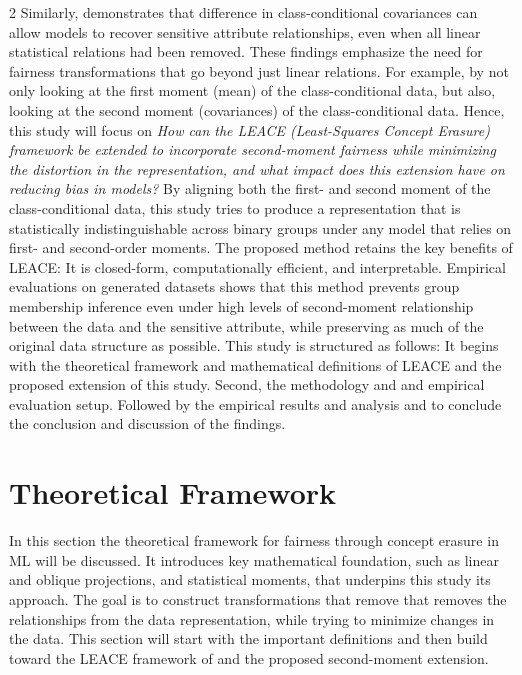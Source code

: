 \documentclass[ecta,nameyear,final]{econsocart}
\numberwithin{equation}{section}
\theoremstyle{plain}
\theoremstyle{definition}
\begin{document}
\begin{multicols}{2}
\newline \newline
Similarly, \cite{Shashwat2024} demonstrates that difference in class-conditional covariances can allow models to recover sensitive attribute relationships, even when all linear statistical relations had been removed. 
\newline \newline
These findings emphasize the need for fairness transformations that go beyond just linear relations. For example, by not only looking at the first moment (mean) of the class-conditional data, but also, looking at the second moment (covariances) of the class-conditional data.
\newline \newline
Hence, this study will focus on \emph{How can the LEACE (Least-Squares Concept Erasure) framework be extended to incorporate second-moment fairness while minimizing the distortion in the representation, and what impact does this extension have on reducing bias in models?}
\newline \newline
By aligning both the first- and second moment of the class-conditional data, this study tries to produce a representation that is statistically indistinguishable across binary groups under any model that relies on first- and second-order moments. 
\newline \newline
The proposed method retains the key benefits of LEACE: It is closed-form, computationally efficient, and interpretable.
\newline \newline
Empirical evaluations on generated datasets shows that this method prevents group membership inference even under high levels of second-moment relationship between the data and the sensitive attribute, while preserving as much of the original data structure as possible.
\newline \newline
This study is structured as follows: It begins with the theoretical framework and mathematical definitions of LEACE and the proposed extension of this study. Second, the methodology and and empirical evaluation setup. Followed by the empirical results and analysis and to conclude the conclusion and discussion of the findings.
\section{Theoretical Framework}
In this section the theoretical framework for fairness through concept erasure in ML will be discussed. It introduces key mathematical foundation, such as linear and oblique projections, and statistical moments, that underpins this study its approach.
\newline \newline
The goal is to construct transformations that remove that removes the relationships from the data representation, while trying to minimize changes in the data. This section will start with the important definitions and then build toward the LEACE framework of \cite{Belrose2023} and the proposed second-moment extension.


\end{multicols}
\end{document}

